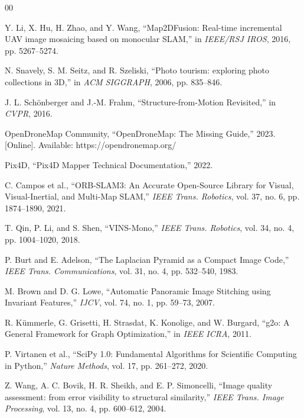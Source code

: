 \documentclass[conference]{IEEEtran}
\begin{document}
\begin{thebibliography}{00}

Y. Li, X. Hu, H. Zhao, and Y. Wang, ``Map2DFusion: Real-time incremental UAV image mosaicing based on monocular SLAM,'' in \textit{IEEE/RSJ IROS}, 2016, pp. 5267--5274.

N. Snavely, S. M. Seitz, and R. Szeliski, ``Photo tourism: exploring photo collections in 3D,'' in \textit{ACM SIGGRAPH}, 2006, pp. 835--846.

J. L. Sch{\"o}nberger and J.-M. Frahm, ``Structure-from-Motion Revisited,'' in \textit{CVPR}, 2016.

OpenDroneMap Community, ``OpenDroneMap: The Missing Guide,'' 2023. [Online]. Available: https://opendronemap.org/

Pix4D, ``Pix4D Mapper Technical Documentation,'' 2022.

C. Campos et al., ``ORB-SLAM3: An Accurate Open-Source Library for Visual, Visual-Inertial, and Multi-Map SLAM,'' \textit{IEEE Trans. Robotics}, vol. 37, no. 6, pp. 1874--1890, 2021.

T. Qin, P. Li, and S. Shen, ``VINS-Mono,'' \textit{IEEE Trans. Robotics}, vol. 34, no. 4, pp. 1004--1020, 2018.

P. Burt and E. Adelson, ``The Laplacian Pyramid as a Compact Image Code,'' \textit{IEEE Trans. Communications}, vol. 31, no. 4, pp. 532--540, 1983.

M. Brown and D. G. Lowe, ``Automatic Panoramic Image Stitching using Invariant Features,'' \textit{IJCV}, vol. 74, no. 1, pp. 59--73, 2007.

R. K{\"u}mmerle, G. Grisetti, H. Strasdat, K. Konolige, and W. Burgard, ``g2o: A General Framework for Graph Optimization,'' in \textit{IEEE ICRA}, 2011.

P. Virtanen et al., ``SciPy 1.0: Fundamental Algorithms for Scientific Computing in Python,'' \textit{Nature Methods}, vol. 17, pp. 261--272, 2020.

Z. Wang, A. C. Bovik, H. R. Sheikh, and E. P. Simoncelli, ``Image quality assessment: from error visibility to structural similarity,'' \textit{IEEE Trans. Image Processing}, vol. 13, no. 4, pp. 600--612, 2004.


\end{thebibliography}
\end{document}
